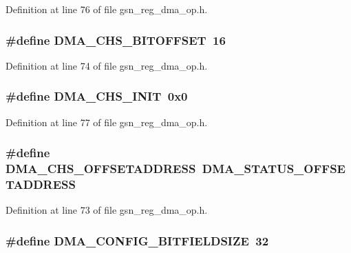 Definition at line 76 of file gsn\_\-reg\_\-dma\_\-op.h.

\hypertarget{a00547_adadd26e82ada74d711ae27f63de8ec9d}{
\subsubsection[{DMA\_\-CHS\_\-BITOFFSET}]{\setlength{\rightskip}{0pt plus 5cm}\#define DMA\_\-CHS\_\-BITOFFSET~16}}
\label{a00547_adadd26e82ada74d711ae27f63de8ec9d}


Definition at line 74 of file gsn\_\-reg\_\-dma\_\-op.h.

\hypertarget{a00547_a9e3e6d6c98a2c203c72cee4f2af8c047}{
\subsubsection[{DMA\_\-CHS\_\-INIT}]{\setlength{\rightskip}{0pt plus 5cm}\#define DMA\_\-CHS\_\-INIT~0x0}}
\label{a00547_a9e3e6d6c98a2c203c72cee4f2af8c047}


Definition at line 77 of file gsn\_\-reg\_\-dma\_\-op.h.

\hypertarget{a00547_a0caf9f2f89504b6f6c0adf2f789b750b}{
\subsubsection[{DMA\_\-CHS\_\-OFFSETADDRESS}]{\setlength{\rightskip}{0pt plus 5cm}\#define DMA\_\-CHS\_\-OFFSETADDRESS~DMA\_\-STATUS\_\-OFFSETADDRESS}}
\label{a00547_a0caf9f2f89504b6f6c0adf2f789b750b}


Definition at line 73 of file gsn\_\-reg\_\-dma\_\-op.h.

\hypertarget{a00547_a622ed5f1635239477a54329777259eaf}{
\subsubsection[{DMA\_\-CONFIG\_\-BITFIELDSIZE}]{\setlength{\rightskip}{0pt plus 5cm}\#define DMA\_\-CONFIG\_\-BITFIELDSIZE~32}}
\label{a00547_a622ed5f1635239477a54329777259eaf}


